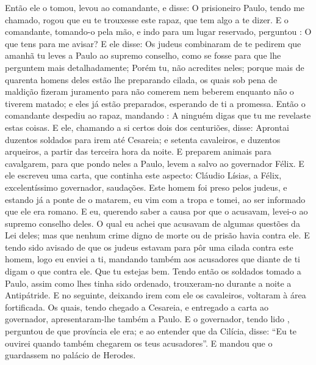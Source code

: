 {  Então ele o tomou, levou ao comandante, e disse: O prisioneiro Paulo, tendo me chamado, rogou
{} que eu te trouxesse este rapaz, que tem algo a te dizer.
  E o comandante, tomando-o pela mão, e indo para um lugar reservado, perguntou
{} : O que tens para me avisar?
  E ele disse: Os judeus combinaram de te pedirem que amanhã tu leves a Paulo ao supremo conselho, como se fosse para que lhe perguntem mais detalhadamente;
  Porém tu, não acredites neles; porque mais de quarenta homens deles estão lhe preparando cilada, os quais sob pena de maldição fizeram juramento para não comerem nem beberem enquanto não o tiverem matado; e eles já estão preparados, esperando de ti a promessa.
  Então o comandante despediu ao rapaz, mandando
{} : A ninguém digas que tu me revelaste estas coisas.
  E ele, chamando a si certos dois dos centuriões, disse: Aprontai duzentos soldados para irem até Cesareia; e setenta cavaleiros, e duzentos arqueiros, a partir das terceira hora da noite.
  E preparem animais para cavalgarem, para que pondo neles a Paulo, levem
{} a salvo ao governador Félix.
  E ele
{} escreveu uma carta, que continha este aspecto:
  Cláudio Lísias, a Félix, excelentíssimo governador, saudações.
  Este homem foi preso pelos judeus, e estando já a ponte de o matarem, eu vim com a tropa e
{} tomei, ao ser informado que ele era romano.
  E eu, querendo saber a causa por que o acusavam, levei-o ao supremo conselho deles.
  O qual eu achei que acusavam de algumas questões da Lei deles; mas que nenhum crime digno de morte ou de prisão havia contra ele.
  E tendo sido avisado de que os judeus estavam para pôr uma cilada contra este homem, logo eu
{} enviei a ti, mandando também aos acusadores que diante de ti digam o que
{} contra ele. Que tu estejas bem.
  Tendo então os soldados tomado a Paulo, assim como lhes tinha sido ordenado, trouxeram-no durante a noite a Antipátride.
  E no
{} seguinte, deixando irem com ele os cavaleiros, voltaram à área fortificada.
  Os quais, tendo chegado a Cesareia, e entregado a carta ao governador, apresentaram-lhe também a Paulo.
  E o governador, tendo lido
{},  perguntou de que província ele era; e ao entender que
{} da Cilícia,
  disse: “Eu te ouvirei quando também chegarem os teus acusadores”. E mandou que o guardassem no palácio
 de Herodes.
\par }

